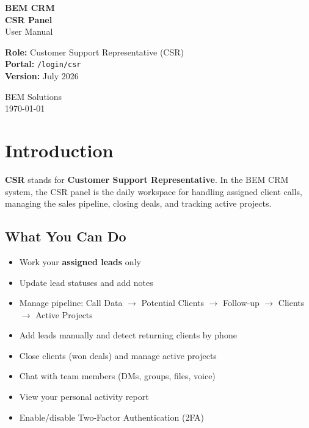 \documentclass[11pt,a4paper]{article}
\begin{document}
\begin{titlepage}
    \centering
    \vspace*{2cm}
    {\Huge\bfseries\color{bemred} BEM CRM}\\[0.4cm]
    {\LARGE\bfseries CSR Panel}\\[0.2cm]
    {\Large User Manual}\\[1.5cm]

    \begin{tcolorbox}[colback=lightgray,colframe=bemred,width=12cm,arc=5pt]
        \centering
        \large
        \textbf{Role:} Customer Support Representative (CSR)\\[0.3cm]
        \textbf{Portal:} \texttt{/login/csr}\\[0.3cm]
        \textbf{Version:} July 2026
    \end{tcolorbox}

    \vfill
    {\large BEM Solutions}\\[0.2cm]
    {\small \today}
\end{titlepage}

\tableofcontents
\newpage

\section{Introduction}

\textbf{CSR} stands for \textbf{Customer Support Representative}. In the BEM CRM system, the CSR panel is the daily workspace for handling assigned client calls, managing the sales pipeline, closing deals, and tracking active projects.

\subsection{What You Can Do}
\begin{itemize}[noitemsep]
    \item Work your \textbf{assigned leads} only
    \item Update lead statuses and add notes
    \item Manage pipeline: Call Data $\rightarrow$ Potential Clients $\rightarrow$ Follow-up $\rightarrow$ Clients $\rightarrow$ Active Projects
    \item Add leads manually and detect returning clients by phone
    \item Close clients (won deals) and manage active projects
    \item Chat with team members (DMs, groups, files, voice)
    \item View your personal activity report
    \item Enable/disable Two-Factor Authentication (2FA)
\end{itemize}
\end{document}
